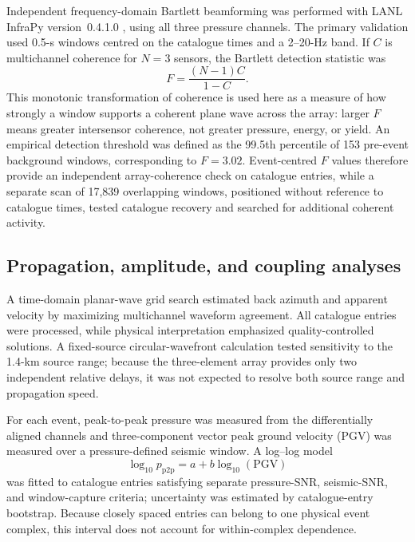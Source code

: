 \documentclass[]{seismica}
\begin{document}
Independent frequency-domain Bartlett beamforming was performed with LANL
InfraPy version~0.4.1.0 \citep{webster_infrapy_2025}, using all three pressure
channels. The primary validation used 0.5-s windows centred on the catalogue
times and a 2--20-Hz band. If $C$ is multichannel coherence for $N=3$
sensors, the Bartlett detection statistic was
\begin{equation}
 F=\frac{(N-1)C}{1-C}.
\end{equation}
This monotonic transformation of coherence is used here as a measure of how
strongly a window supports a coherent plane wave across the array: larger
$F$ means greater intersensor coherence, not greater pressure, energy, or
yield. An empirical detection threshold was defined as the 99.5th percentile
of 153 pre-event background windows, corresponding to $F=3.02$. Event-centred
$F$ values therefore provide an independent array-coherence check on catalogue
entries, while a separate scan of 17,839 overlapping windows, positioned
without reference to catalogue times, tested catalogue recovery and searched
for additional coherent activity.

\subsection{Propagation, amplitude, and coupling analyses}

A time-domain planar-wave grid search estimated back azimuth and apparent
velocity by maximizing multichannel waveform agreement. All catalogue entries
were processed, while physical interpretation emphasized quality-controlled
solutions. A fixed-source circular-wavefront calculation tested sensitivity to
the 1.4-km source range; because the three-element array provides only two
independent relative delays, it was not expected to resolve both source range
and propagation speed.

For each event, peak-to-peak pressure was measured from the differentially
aligned channels and three-component vector peak ground velocity (PGV) was
measured over a pressure-defined seismic window. A log--log model
\begin{equation}
 \log_{10}p_{\mathrm{p2p}}=a+b\log_{10}(\mathrm{PGV})
 \label{eq:power_law}
\end{equation}
was fitted to catalogue entries satisfying separate pressure-SNR, seismic-SNR,
and window-capture criteria; uncertainty was estimated by catalogue-entry
bootstrap. Because closely spaced entries can belong to one physical event
complex, this interval does not account for within-complex dependence.
\end{document}
